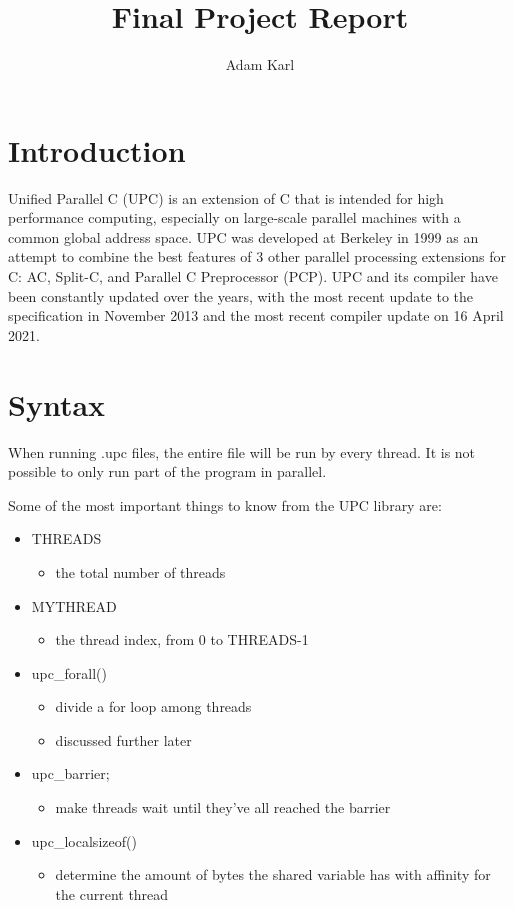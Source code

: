 \documentclass{article}
\title{Final Project Report}
\author{Adam Karl}
\begin{document}
\lstset{language=C}

\maketitle

\section{Introduction}

Unified Parallel C (UPC) is an extension of C that is intended for high performance computing, especially on large-scale parallel machines with a common global address space. UPC was developed at Berkeley in 1999 as an attempt to combine the best features of 3 other parallel processing extensions for C: AC, Split-C, and Parallel C Preprocessor (PCP). UPC and its compiler have been constantly updated over the years, with the most recent update to the specification in November 2013 and the most recent compiler update on 16 April 2021.


\section{Syntax}

When running .upc files, the entire file will be run by every thread. It is not possible to only run part of the program in parallel.

Some of the most important things to know from the UPC library are:

\begin{itemize}
    \item THREADS
    \begin{itemize}
        \item the total number of threads
    \end{itemize}
    \item MYTHREAD
    \begin{itemize}
        \item the thread index, from 0 to THREADS-1
    \end{itemize}
    \item upc\_forall()
    \begin{itemize}
        \item divide a for loop among threads
        \item discussed further later
    \end{itemize}
    \item upc\_barrier;
    \begin{itemize}
        \item make threads wait until they've all reached the barrier
    \end{itemize}
    \item upc\_localsizeof()
    \begin{itemize}
        \item determine the amount of bytes the shared variable has with affinity for the current thread
    \end{itemize}
\end{itemize}
\end{document}
